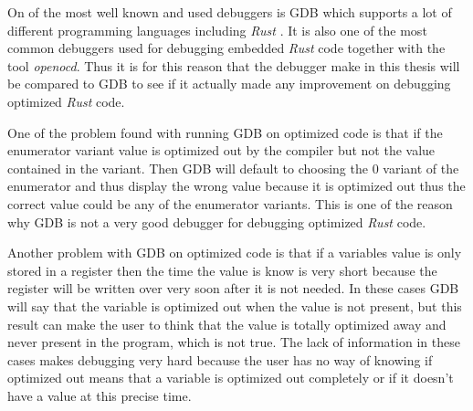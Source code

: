 
On of the most well known and used debuggers is \Gls{GDB} which supports a lot of different programming languages including \emph{Rust} \cite{gdb}.
It is also one of the most common debuggers used for debugging embedded \emph{Rust} code together with the tool \emph{openocd}.
Thus it is for this reason that the debugger make in this thesis will be compared to \Gls{GDB} to see if it actually made any improvement on debugging optimized \emph{Rust} code.


One of the problem found with running \Gls{GDB} on optimized code is that if the enumerator variant value is optimized out by the compiler but not the value contained in the variant.
Then \Gls{GDB} will default to choosing the $0$ variant of the enumerator and thus display the wrong value because it is optimized out thus the correct value could be any of the enumerator variants.
This is one of the reason why \Gls{GDB} is not a very good debugger for debugging optimized \emph{Rust} code. %

Another problem with \Gls{GDB} on optimized code is that if a variables value is only stored in a register then the time the value is know is very short because the register will be written over very soon after it is not needed.
In these cases \Gls{GDB} will say that the variable is optimized out when the value is not present, but this result can make the user to think that the value is totally optimized away and never present in the program, which is not true.
The lack of information in these cases makes debugging very hard because the user has no way of knowing if optimized out means that a variable is optimized out completely or if it doesn't have a value at this precise time.

